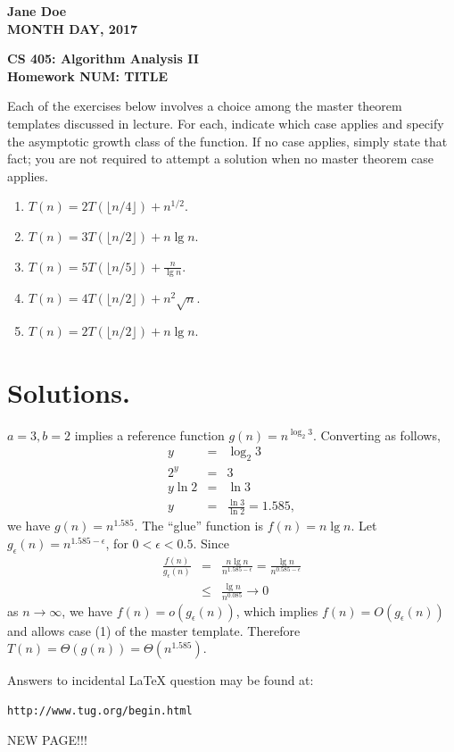 \documentclass{article}%
\begin{document}
\begin{flushright}
\textbf{Jane Doe \\
MONTH DAY, 2017}
\end{flushright}

\begin{center}
\textbf{CS 405: Algorithm Analysis II \\
Homework NUM: TITLE} \\
\end{center}

Each of the exercises below involves a choice among the master theorem templates discussed in lecture.
For each, indicate which case applies and specify the asymptotic growth class of the function.  If no
case applies, simply state that fact; you are not required to attempt a solution when no master theorem case
applies.

\begin{enumerate}
\item $T(n) = 2 T(\lfloor n/4 \rfloor) + n^{1/2}$.
\item $T(n) = 3 T(\lfloor n/2 \rfloor) + n \lg n$.
\item $T(n) = 5 T(\lfloor n/5 \rfloor) + \frac{n}{\lg n}$.
\item $T(n) = 4 T(\lfloor n/2 \rfloor) + n^2 \sqrt{n}$.
\item $T(n) = 2 T(\lfloor n/2 \rfloor) + n \lg n$.
\end{enumerate}

\section*{Solutions.}
$a = 3, b = 2$ implies a reference function $g(n) = n^{\log_2 3}$. Converting as follows,
\begin{eqnarray*}
y & = & \log_2 3 \\
2^y & = & 3 \\
y \ln 2 & = & \ln 3 \\
y & = & \frac{\ln 3}{\ln 2} = 1.585,
\end{eqnarray*}
we have $g(n) = n^{1.585}$.  The ``glue'' function is $f(n) = n \lg n$.  Let $g_\epsilon (n) = n^{1.585 - \epsilon}$, for 
$0 < \epsilon < 0.5$. Since
\begin{eqnarray*}
\frac{f(n)}{g_\epsilon (n)} & = & \frac{n \lg n}{n^{1.585 - \epsilon}} = \frac{\lg n}{n^{0.585 - \epsilon}} \\
 & \leq & \frac{\lg n}{n^{0.085}} \rightarrow 0
\end{eqnarray*}
as $n \rightarrow \infty$, we have $f(n) = o(g_\epsilon (n))$, which implies $f(n) = O(g_\epsilon (n))$ and allows case (1) of the 
master template.  Therefore $T(n) = \Theta(g(n)) = \Theta(n^{1.585})$.

\vspace*{0.5in}
\noindent Answers to incidental LaTeX question may be found at:
\begin{verbatim}
http://www.tug.org/begin.html
\end{verbatim}

\newpage
NEW PAGE!!!
\end{document}
